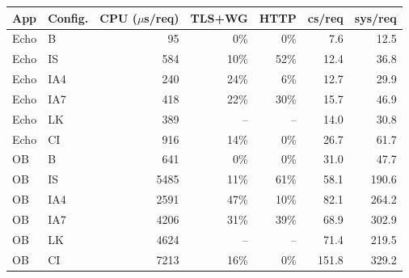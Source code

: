 \begin{tabular}{llrrrrr}
\toprule
App & Config. & CPU ($\mu$s/req) & TLS+WG & HTTP & cs/req & sys/req \\
\midrule
Echo & B & 95 & 0\% & 0\% & 7.6 & 12.5 \\
Echo & IS & 584 & 10\% & 52\% & 12.4 & 36.8 \\
Echo & IA4 & 240 & 24\% & 6\% & 12.7 & 29.9 \\
Echo & IA7 & 418 & 22\% & 30\% & 15.7 & 46.9 \\
Echo & LK & 389 & -- & -- & 14.0 & 30.8 \\
Echo & CI & 916 & 14\% & 0\% & 26.7 & 61.7 \\
OB & B & 641 & 0\% & 0\% & 31.0 & 47.7 \\
OB & IS & 5485 & 11\% & 61\% & 58.1 & 190.6 \\
OB & IA4 & 2591 & 47\% & 10\% & 82.1 & 264.2 \\
OB & IA7 & 4206 & 31\% & 39\% & 68.9 & 302.9 \\
OB & LK & 4624 & -- & -- & 71.4 & 219.5 \\
OB & CI & 7213 & 16\% & 0\% & 151.8 & 329.2 \\
\bottomrule
\end{tabular}
